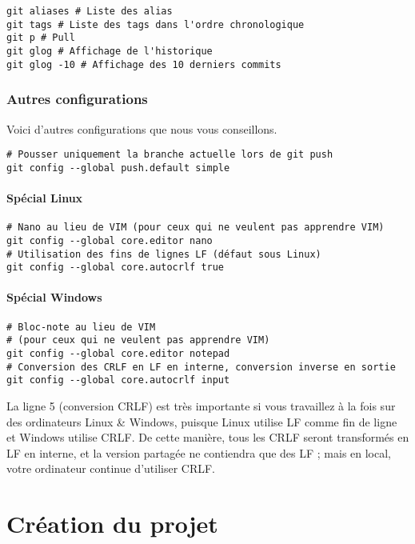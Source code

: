 \documentclass[10pt,a4paper]{article}
\begin{document}
\begin{verbatim}
git aliases # Liste des alias
git tags # Liste des tags dans l'ordre chronologique
git p # Pull
git glog # Affichage de l'historique
git glog -10 # Affichage des 10 derniers commits
\end{verbatim}

\subsubsection{Autres configurations}

Voici d'autres configurations que nous vous conseillons.

\begin{verbatim}
# Pousser uniquement la branche actuelle lors de git push
git config --global push.default simple
\end{verbatim}

\paragraph{Spécial Linux}

\begin{verbatim}
# Nano au lieu de VIM (pour ceux qui ne veulent pas apprendre VIM)
git config --global core.editor nano
# Utilisation des fins de lignes LF (défaut sous Linux)
git config --global core.autocrlf true
\end{verbatim}

\paragraph{Spécial Windows}

\begin{verbatim}
# Bloc-note au lieu de VIM
# (pour ceux qui ne veulent pas apprendre VIM)
git config --global core.editor notepad
# Conversion des CRLF en LF en interne, conversion inverse en sortie
git config --global core.autocrlf input
\end{verbatim}

La ligne 5 (conversion CRLF) est très importante si vous travaillez à la fois sur des ordinateurs Linux \& Windows, puisque Linux utilise LF comme fin de ligne et Windows utilise CRLF. De cette manière, tous les CRLF seront transformés en LF en interne, et la version partagée ne contiendra que des LF ; mais en local, votre ordinateur continue d'utiliser CRLF.

\section{Création du projet}
\end{document}

